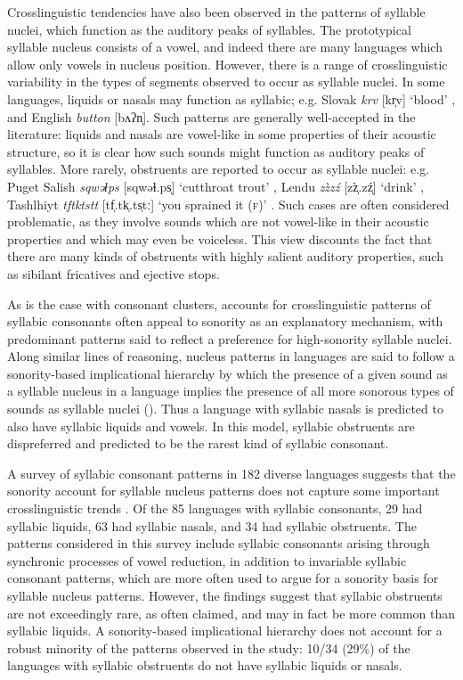   Crosslinguistic tendencies have also been observed in the patterns of syllable nuclei, which function as the auditory peaks of syllables. The prototypical syllable nucleus consists of a vowel, and indeed there are many languages which allow only vowels in nucleus position. However, there is a range of crosslinguistic variability in the types of segments observed to occur as syllable nuclei. In some languages, liquids or nasals may function as syllabic; e.g. Slovak \textit{krv} [kr̩v] ‘blood’ \citep[186]{Zec2007}, and English \textit{button} [bʌʔn̩]. Such patterns are generally well-accepted in the literature: liquids and nasals are vowel-like in some properties of their acoustic structure, so it is clear how such sounds might function as auditory peaks of syllables. More rarely, obstruents are reported to occur as syllable nuclei: e.g. Puget Salish \textit{sqwəɬps} [sqwəɬ.ps̩] ‘cutthroat trout’ \citep[62]{Hoard1978}, Lendu \textit{zz̀zź} [z\`z̩.zź̩] ‘drink’ \citep[483]{Demolin2002}, Tashlhiyt \textit{tftktstt} [tf̩.tk̩.ts̩tː] ‘you sprained it (\textsc{f})’ \citep[332]{Ridouane2008}. Such cases are often considered problematic, as they involve sounds which are not vowel-like in their acoustic properties and which may even be voiceless. This view discounts the fact that there are many kinds of obstruents with highly salient auditory properties, such as sibilant fricatives and ejective stops.

  As is the case with consonant clusters, accounts for crosslinguistic patterns of syllabic consonants often appeal to sonority as an explanatory mechanism, with predominant patterns said to reflect a preference for high-sonority syllable nuclei. Along similar lines of reasoning, nucleus patterns in languages are said to follow a sonority-based implicational hierarchy by which the presence of a given sound as a syllable nucleus in a language implies the presence of all more sonorous types of sounds as syllable nuclei (\citealt{Blevins1995,Zec2007}). Thus a language with syllabic nasals is predicted to also have syllabic liquids and vowels. In this model, syllabic obstruents are dispreferred and predicted to be the rarest kind of syllabic consonant.

  A survey of syllabic consonant patterns in 182 diverse languages suggests that the sonority account for syllable nucleus patterns does not capture some important crosslinguistic trends \citep{Bell1978a}. Of the 85 languages with syllabic consonants, 29 had syllabic liquids, 63 had syllabic nasals, and 34 had syllabic obstruents. The patterns considered in this survey include syllabic consonants arising through synchronic processes of vowel reduction, in addition to invariable syllabic consonant patterns, which are more often used to argue for a sonority basis for syllable nucleus patterns. However, the findings suggest that syllabic obstruents are not exceedingly rare, as often claimed, and may in fact be more common than syllabic liquids. A sonority-based implicational hierarchy does not account for a robust minority of the patterns observed in the study: 10/34 (29\%) of the languages with syllabic obstruents do not have syllabic liquids or nasals.

